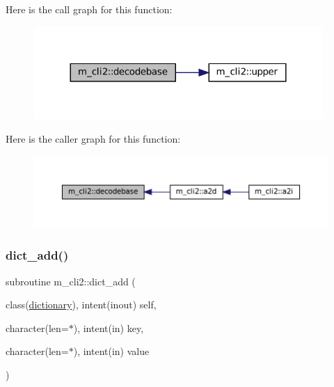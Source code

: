 Here is the call graph for this function\+:\nopagebreak
\begin{figure}[H]
\begin{center}
\leavevmode
\includegraphics[width=312pt]{namespacem__cli2_a1029304d495b2bf791e03cfab5983bbb_cgraph}
\end{center}
\end{figure}
Here is the caller graph for this function\+:\nopagebreak
\begin{figure}[H]
\begin{center}
\leavevmode
\includegraphics[width=350pt]{namespacem__cli2_a1029304d495b2bf791e03cfab5983bbb_icgraph}
\end{center}
\end{figure}
\mbox{\label{namespacem__cli2_a601a06b7038b524abababc8d437ee823}} 
\subsubsection{\texorpdfstring{dict\+\_\+add()}{dict\_add()}}
{\footnotesize\ttfamily subroutine m\+\_\+cli2\+::dict\+\_\+add (\begin{DoxyParamCaption}\item[{class(\mbox{\hyperlink{structm__cli2_1_1dictionary}{dictionary}}), intent(inout)}]{self,  }\item[{character(len=$\ast$), intent(in)}]{key,  }\item[{character(len=$\ast$), intent(in)}]{value }\end{DoxyParamCaption})\hspace{0.3cm}{\ttfamily [private]}}




